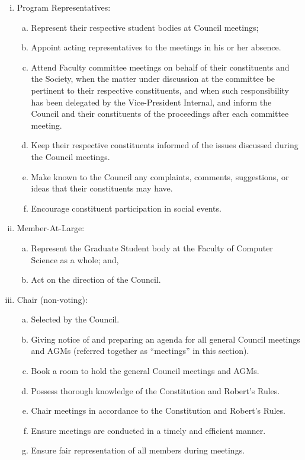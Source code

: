 \documentclass[]{report}
\begin{document}
\begin{enumerate}
		\begin{enumerate}[i.]
			\item Program Representatives:
				\begin{enumerate}[(a)]
					\item Represent their respective student bodies at Council meetings;
					\item Appoint acting representatives to the meetings in his or her absence.
					\item Attend Faculty committee meetings on behalf of their constituents and the Society, when the matter under discussion at the committee be pertinent to their respective constituents, and when such responsibility has been delegated by the Vice-President Internal, and inform the Council and their constituents of the proceedings after each committee meeting.
					\item Keep their respective constituents informed of the issues discussed during the Council meetings.
					\item Make known to the Council any complaints, comments, suggestions, or ideas that their constituents may have.
					\item Encourage constituent participation in social events.
				\end{enumerate}

			\item Member-At-Large:
				\begin{enumerate}[(a)]
					\item Represent the Graduate Student body at the Faculty of Computer Science as a whole; and,
					\item Act on the direction of the Council.
				\end{enumerate}
				
			\item Chair (non-voting):
				\begin{enumerate}[(a)]
					\item Selected by the Council.
					\item Giving notice of and preparing an agenda for all general Council meetings and AGMs (referred together as “meetings” in this section).
					\item Book a room to hold the general Council meetings and AGMs.
					\item Possess thorough knowledge of the Constitution and Robert’s Rules.
					\item Chair meetings in accordance to the Constitution and Robert’s Rules.
					\item Ensure meetings are conducted in a timely and efficient manner.
					\item Ensure fair representation of all members during meetings.
				\end{enumerate}


\end{enumerate}
\end{enumerate}
\end{document}
